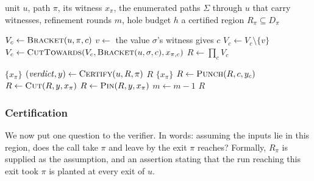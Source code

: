 \documentclass[manuscript,anonymous]{acmart}
\begin{document}
\begin{algorithm}[!htpb]
\caption{Building a certified input region for one path}
\label{alg:region}
\begin{algorithmic}[1]
\Require unit $u$, path $\pi$, its witness $x_\pi$, the enumerated paths $\Sigma$
         through $u$ that carry witnesses, refinement rounds $m$, hole budget $h$
\Ensure a certified region $R_\pi \subseteq D_\pi$

    \State $V_c \gets \textsc{Bracket}(u, \pi, c)$
    \ForAll{$\sigma \in \Sigma$}
        \State $v \gets$ the value $\sigma$'s witness gives $c$
            \State $V_c \gets V_c \setminus \{v\}$
        \Else
            \State $V_c \gets \textsc{CutTowards}(V_c,
                   \textsc{Bracket}(u, \sigma, c), x_{\pi,c})$
        \EndIf
    \EndFor
\EndFor
\State $R \gets \prod_{c} V_c$

        \State \Return $\{x_\pi\}$
    \EndIf
    \State $(\mathit{verdict}, y) \gets \textsc{Certify}(u, R, \pi)$
        \State \Return $R$
        \State \Return $\{x_\pi\}$
    \EndIf
        \State $R \gets \textsc{Punch}(R, c, y_c)$
        \State $R \gets \textsc{Cut}(R, y, x_\pi)$
    \Else
        \State $R \gets \textsc{Pin}(R, y, x_\pi)$
    \EndIf
    \State $m \gets m - 1$
\EndWhile
\State \Return $R$
\end{algorithmic}
\end{algorithm}

\subsubsection{Certification}\label{sec:cert}
We now put one question to the verifier. In words: assuming the inputs lie in
this region, does the call take $\pi$ and leave by the exit $\pi$ reaches?
Formally, $R_\pi$ is supplied as the assumption, and an assertion stating that
the run reaching this exit took $\pi$ is planted at every exit of $u$.
\end{document}
